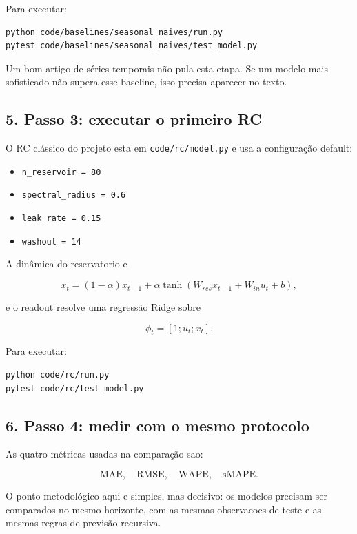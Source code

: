 \documentclass[12pt]{article}
\providecommand{\tightlist}{%
          \setlength{\itemsep}{0pt}\setlength{\parskip}{0pt}}
\begin{document}
Para executar:

\begin{verbatim}
python code/baselines/seasonal_naives/run.py
pytest code/baselines/seasonal_naives/test_model.py
\end{verbatim}

Um bom artigo de séries temporais não pula esta etapa. Se um modelo mais sofisticado não supera esse baseline, isso precisa aparecer no texto.

\subsection{5. Passo 3: executar o primeiro RC}\label{5-passo-3-executar-o-primeiro-rc}

O RC clássico do projeto esta em \texttt{code/rc/model.py} e usa a configuração default:

\begin{itemize}
\tightlist
\item
  \texttt{n\_reservoir\ =\ 80}
\item
  \texttt{spectral\_radius\ =\ 0.6}
\item
  \texttt{leak\_rate\ =\ 0.15}
\item
  \texttt{washout\ =\ 14}
\end{itemize}

A dinâmica do reservatorio e

\[
x_t = (1 - \alpha) x_{t-1} + \alpha \tanh(W_{res} x_{t-1} + W_{in} u_t + b),
\]

e o readout resolve uma regressão Ridge sobre

\[
\phi_t = [1; u_t; x_t].
\]

Para executar:

\begin{verbatim}
python code/rc/run.py
pytest code/rc/test_model.py
\end{verbatim}

\subsection{6. Passo 4: medir com o mesmo protocolo}\label{6-passo-4-medir-com-o-mesmo-protocolo}

As quatro métricas usadas na comparação sao:

\[
\mathrm{MAE},\quad \mathrm{RMSE},\quad \mathrm{WAPE},\quad \mathrm{sMAPE}.
\]

O ponto metodológico aqui e simples, mas decisivo: os modelos precisam ser comparados no mesmo horizonte, com as mesmas observacoes de teste e as mesmas regras de previsão recursiva.
\end{document}
